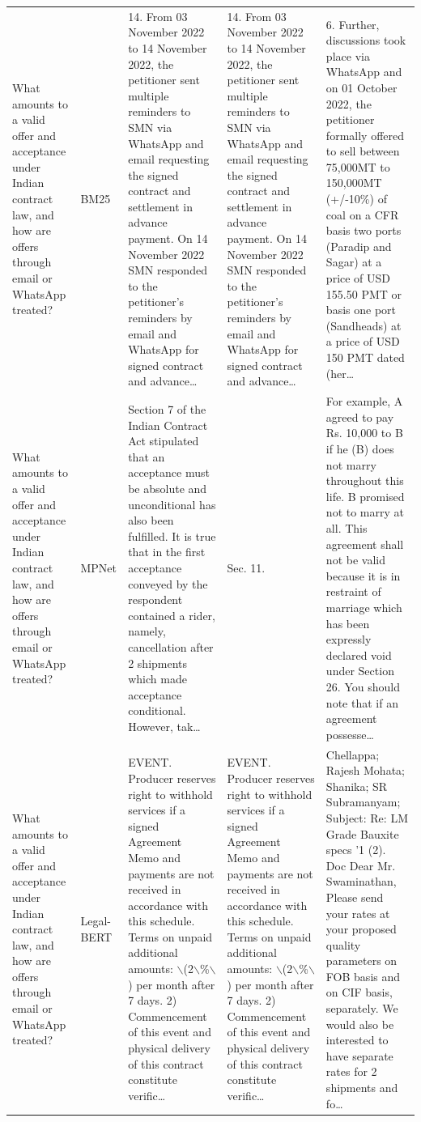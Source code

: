 \documentclass[11pt]{article}
\begin{document}
\begin{xltabular}{\textwidth}{|p{3.2cm}|p{2.2cm}|Y|Y|Y|}
       What amounts to a valid offer and acceptance under Indian contract law, and how are offers through email or WhatsApp treated? & BM25 & 14. From 03 November 2022 to 14 November 2022, the petitioner sent multiple reminders to SMN via WhatsApp and email requesting the signed contract and settlement in advance payment. On 14 November 2022 SMN responded to the petitioner's reminders by email and WhatsApp for signed contract and advance… & 14. From 03 November 2022 to 14 November 2022, the petitioner sent multiple reminders to SMN via WhatsApp and email requesting the signed contract and settlement in advance payment. On 14 November 2022 SMN responded to the petitioner's reminders by email and WhatsApp for signed contract and advance… & 6. Further, discussions took place via WhatsApp and on 01 October 2022, the petitioner formally offered to sell between 75,000MT to 150,000MT (+/-10\%) of coal on a CFR basis two ports (Paradip and Sagar) at a price of USD 155.50 PMT or basis one port (Sandheads) at a price of USD 150 PMT dated (her… \\ 
        What amounts to a valid offer and acceptance under Indian contract law, and how are offers through email or WhatsApp treated? & MPNet & Section 7 of the Indian Contract Act stipulated that an acceptance must be absolute and unconditional has also been fulfilled. It is true that in the first acceptance conveyed by the respondent contained a rider, namely, cancellation after 2 shipments which made acceptance conditional. However, tak… & Sec. 11. & For example, A agreed to pay Rs. 10,000 to B if he (B) does not marry throughout this life. B promised not to marry at all. This agreement shall not be valid because it is in restraint of marriage which has been expressly declared void under Section 26. You should note that if an agreement possesse… \\ 
        What amounts to a valid offer and acceptance under Indian contract law, and how are offers through email or WhatsApp treated? & Legal-BERT & EVENT. Producer reserves right to withhold services if a signed Agreement Memo and payments are not received in accordance with this schedule. Terms on unpaid additional amounts: $\backslash$(2$\backslash$\%$\backslash$) per month after 7 days.  2) Commencement of this event and physical delivery of this contract constitute verific… & EVENT. Producer reserves right to withhold services if a signed Agreement Memo and payments are not received in accordance with this schedule. Terms on unpaid additional amounts: $\backslash$(2$\backslash$\%$\backslash$) per month after 7 days.  2) Commencement of this event and physical delivery of this contract constitute verific… & Chellappa; Rajesh Mohata; Shanika; SR Subramanyam;  Subject: Re: LM Grade Bauxite specs '1 (2). Doc  Dear Mr. Swaminathan,  Please send your rates at your proposed quality parameters on FOB basis and on CIF basis, separately. We would also be interested to have separate rates for 2 shipments and fo… \\ 

\end{xltabular}
\end{document}
